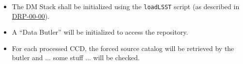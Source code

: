 \begin{itemize}

  \item{The DM Stack shall be initialized using the \texttt{loadLSST} script
  (as described in \hyperref[drp-00-00]{DRP-00-00}).}

  \item{A ``Data Butler'' will be initialized to access the repository.}

  \item{For each processed CCD, the forced source catalog will be retrieved by
  the butler and ... some stuff ... will be checked.}

\end{itemize}
